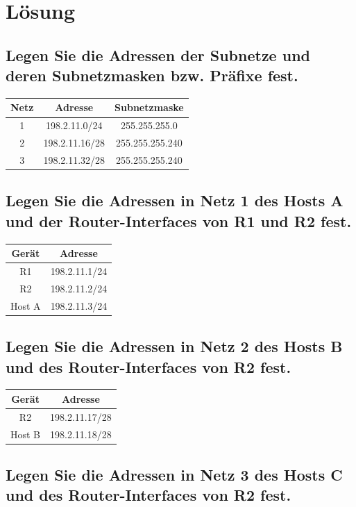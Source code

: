 \documentclass{article}
\begin{document}
\section*{Lösung}

\subsection{Legen Sie die Adressen der Subnetze und deren Subnetzmasken bzw. Präfixe fest.}

\begin{tabular}{|c|c|c|}
	\hline
	Netz & Adresse        & Subnetzmaske    \\
	\hline
	1    & 198.2.11.0/24  & 255.255.255.0   \\
	\hline
	2    & 198.2.11.16/28 & 255.255.255.240 \\
	\hline
	3    & 198.2.11.32/28 & 255.255.255.240 \\
	\hline
\end{tabular}

\subsection{Legen Sie die Adressen in Netz 1 des Hosts A und der Router-Interfaces von R1 und R2 fest.}

\begin{tabular}{|c|c|}
	\hline
	Gerät  & Adresse       \\
	\hline
	R1     & 198.2.11.1/24 \\
	\hline
	R2     & 198.2.11.2/24 \\
	\hline
	Host A & 198.2.11.3/24 \\
	\hline
\end{tabular}

\subsection{Legen Sie die Adressen in Netz 2 des Hosts B und des Router-Interfaces von R2 fest.}

\begin{tabular}{|c|c|}
	\hline
	Gerät  & Adresse        \\
	\hline
	R2     & 198.2.11.17/28 \\
	\hline
	Host B & 198.2.11.18/28 \\
	\hline
\end{tabular}

\subsection{Legen Sie die Adressen in Netz 3 des Hosts C und des Router-Interfaces von R2 fest.}
\end{document}
